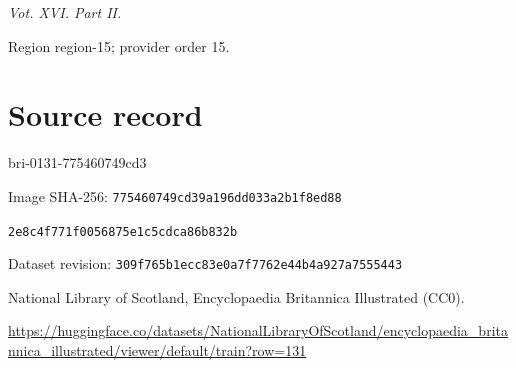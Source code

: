 \documentclass[11pt]{article}
\begin{document}
{\small\itshape Vot. XVI. Part II.\par}

{\scriptsize\color{gray} Region region-15; provider order 15.\par}
\medskip
\newpage\section*{Source record}
bri-0131-775460749cd3\par
Image SHA-256: \texttt{775460749cd39a196dd033a2b1f8ed88}\par\texttt{2e8c4f771f0056875e1c5cdca86b832b}\par
Dataset revision: \texttt{309f765b1ecc83e0a7f7}\texttt{762e44b4a927a7555443}\par
National Library of Scotland, Encyclopaedia Britannica Illustrated (CC0).\par
\url{https://huggingface.co/datasets/NationalLibraryOfScotland/encyclopaedia_britannica_illustrated/viewer/default/train?row=131}
\end{document}
